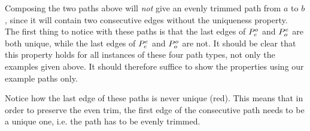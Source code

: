 Composing the two paths above will \textit{not} give an evenly trimmed path from $a$ to $b$, since it will contain two consecutive edges without the uniqueness property.\\

The first thing to notice with these paths is that the last edges of $P^o_e$ and $P^e_o$ are both unique, while the last edges of $P^e_e$ and $P^o_o$ are not.
It should be clear that this property holds for all instances of these four path types, not only the examples given above.  It should therefore suffice to show the properties using our example paths only.

Notice how the last edge of these paths is never unique (red).  This means that in order to preserve the even trim, the first edge of the consecutive path needs to be a unique one, i.e. the path has to be evenly trimmed.

